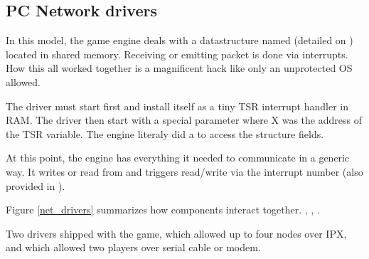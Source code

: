 




\subsection{PC Network drivers}
In this model, the game engine deals with a datastructure named  (detailed on \pageref{doomcom_t.c}) located in shared memory. Receiving or emitting packet is done via interrupts. How this all worked together is a magnificent hack like only an unprotected OS allowed.\\
\par
The driver must start first and install itself as a tiny TSR interrupt handler in RAM. The driver then start  with a special parameter  where X was the address of the TSR  variable. The engine literaly did a  to access the structure fields.\\
\par

\par
 At this point, the engine has everything it needed to communicate in a generic way. It writes or read from  and triggers read/write via the interrupt number (also provided in ).\\
\par
{}
\par
Figure \ref{net_drivers} summarizes how components interact together. , , .\\
\par
Two drivers shipped with the game,  which allowed up to four nodes over IPX, and  which allowed two players over serial cable or modem.\\
\pagebreak






